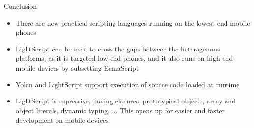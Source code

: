 \documentclass[a4paper,landscape]{slides}
\begin{document}
\begin{slide}
	{\large 
            Conclusion
        }
	\begin{itemize} \setlength{\itemsep}{0mm}
            \item There are now practical scripting languages running on the lowest end mobile phones
	\end{itemize}
	\begin{itemize} \setlength{\itemsep}{-2mm}
            \item LightScript can be used to cross the gaps between the heterogenous platforms, as it is targeted low-end phones, and it also runs on high end mobile devices by subsetting EcmaScript
            \item Yolan and LightScript support execution of source code loaded at runtime
            \item LightScript is expressive, having closures, prototypical objects, array and object literals, dynamic typing, ... This opens up for easier and faster development on mobile devices
	\end{itemize}
\end{slide}
\end{document}
